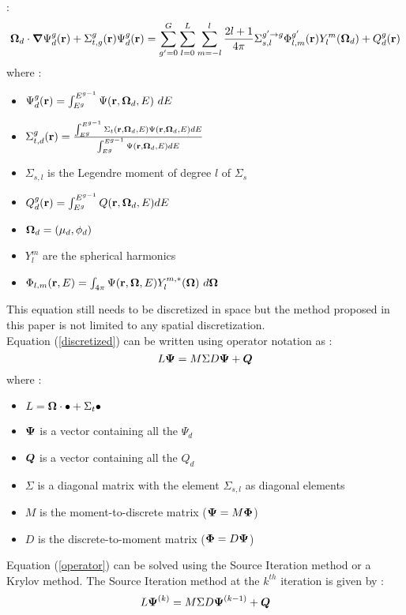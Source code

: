 \cite{reuss} :
\begin{equation}
\boldsymbol{\Omega}_d \cdot \boldsymbol{\nabla} \Psi_d^g(\mathbf{r}) + \Sigma_{t,g}^g(\mathbf{r}) \Psi_d^g(\mathbf{r}) = \sum_{g'=0}^G
\sum_{l=0}^L\sum_{m=-l}^l \frac{2l+1}{4\pi}\Sigma_{s,l}^{g'\rightarrow
g}\Phi_{l,m}^{g'}(\mathbf{r})Y_l^m(\boldsymbol{\Omega}_d) + Q_d^g(\mathbf{r})
\label{discretized}
\end{equation}
where :
\begin{itemize}
\item $\Psi_d^g(\br)=\int_{E^{g}}^{E^{g-1}}\Psi(\br,\bo_d,E)\ dE$
\item $\Sigma_{t,d}^g(\mathbf{r}) = \frac{\int_{E^{g}}^{E^{g-1}}\Sigma_t(\mathbf{r},\boldsymbol{\Omega}_d,E)
\Psi(\mathbf{r},\boldsymbol{\Omega}_d,E) dE}{\int_{E^g}^{E^{g-1}}\Psi(\mathbf{r},\boldsymbol{\Omega}_d,E) dE}$
\item $\Sigma_{s,l}$ is the Legendre moment of degree $l$ of $\Sigma_s$
\item $Q_d^g(\mathbf{r}) = \int_{E^g}^{E^{g-1}}Q(\mathbf{r},\boldsymbol{\Omega}_d,E) dE$
\item $\boldsymbol{\Omega}_d = (\mu_d,\phi_d)$
\item $Y_l^m$ are the spherical harmonics
\item $\Phi_{l,m}(\mathbf{r},E)= \int_{4\pi}\Psi(\mathbf{r},\boldsymbol{\Omega},E)Y_l^{m,*}(\boldsymbol{\Omega})\ d\boldsymbol{\Omega}$
\end{itemize}
This equation still needs to be discretized in space but the method proposed
in this paper is not limited to any spatial discretization.\\ 
Equation (\ref{discretized}) can be written using operator notation as :
\begin{equation}
L \boldsymbol{\Psi} = M\Sigma D \boldsymbol{\Psi} + \boldsymbol{Q}
\label{operator}
\end{equation}
where :
\begin{itemize}
\item $L = \boldsymbol{\Omega}\cdot \bullet + \Sigma_t \bullet$
\item $\boldsymbol{\Psi}$ is a vector containing all the $\Psi_d$
\item $\boldsymbol{Q}$ is a vector containing all the $Q_d$
\item $\Sigma$ is a diagonal matrix with the element $\Sigma_{s,l}$ as
diagonal elements
\item $M$ is the moment-to-discrete matrix ($\boldsymbol{\Psi}=M\boldsymbol{\Phi}$)
\item $D$ is the discrete-to-moment matrix ($\boldsymbol{\Phi}=D\boldsymbol{\Psi}$)
\end{itemize}
Equation (\ref{operator}) can be solved using the Source Iteration method or a
Krylov method. The Source Iteration method at the $k^{th}$ iteration is given
by :
\begin{equation}
L\boldsymbol{\Psi}^{(k)} = M\Sigma D \boldsymbol{\Psi}^{(k-1)} + \boldsymbol{Q}
\end{equation}
